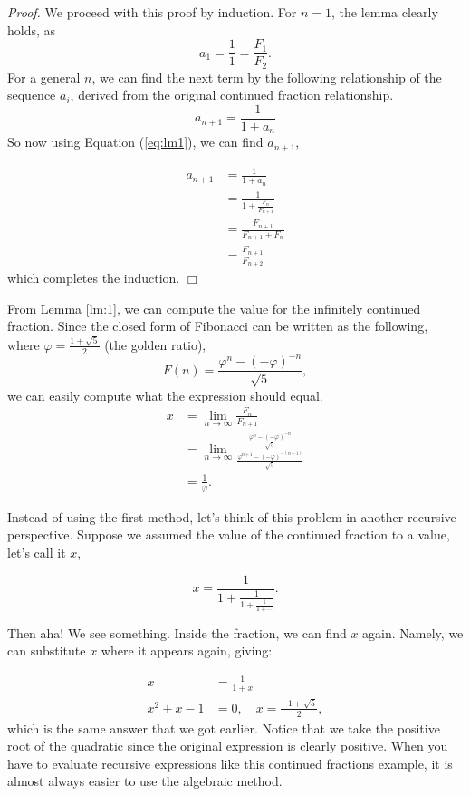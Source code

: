 \textit{Proof.} We proceed with this proof by induction. For $n=1$, the lemma clearly holds, as
$$a_1 = \frac{1}{1}= \frac{F_1}{F_2}.$$
For a general $n$, we can find the next term by the following relationship of the sequence $a_i$, derived from the original continued fraction relationship.
\begin{equation}
    a_{n+1} = \frac{1}{1+a_{n}}
    \label{eq:lm1}
\end{equation}
So now using Equation (\ref{eq:lm1}), we can find $a_{n+1}$, 

\begin{align*}
    a_{n+1} &= \frac{1}{1+a_{n}} \\
            &= \frac{1}{1+\frac{F_n}{F_{n+1}}} \\
            &= \frac{F_{n+1}}{F_{n+1}+F_{n}} \\
            &= \frac{F_{n+1}}{F_{n+2}} 
\end{align*}
which completes the induction. $\Box$

From Lemma \ref{lm:1}, we can compute the value for the infinitely continued fraction. Since the closed form of Fibonacci can be written as the following, where $\varphi = \frac{1+\sqrt{5}}{2}$ (the golden ratio),
\begin{equation}
    F\left(n\right) = \frac{\varphi^n-(-\varphi)^{-n}}{\sqrt{5}},
\end{equation}
we can easily compute what the expression should equal. 
\begin{align*}
    x &= \lim_{n\to\infty} \frac{F_n}{F_{n+1}}\\
      &= \lim_{n\to\infty} \frac{\frac{\varphi^n-(-\varphi)^{-n}}{\sqrt{5}}}{\frac{\varphi^{n+1}-(-\varphi)^{-(n+1)}}{\sqrt{5}}} \\
      &= \boxed{\frac{1}{\varphi}}.
\end{align*}

Instead of using the first method, let's think of this problem in another recursive perspective. Suppose we assumed the value of the continued fraction to a value, let's call it $x$, 

\begin{equation}
    x = \frac{1}{1+\frac{1}{1+\frac{1}{1+\cdots}}}.
\end{equation}

Then aha! We see something. Inside the fraction, we can find $x$ again. Namely, we can substitute $x$ where it appears again, giving:

\begin{align*}
    x &= \frac{1}{1+x} \\
    x^2 + x -1 &= 0, \quad x = \boxed{\frac{-1+\sqrt{5}}{2}},
\end{align*}
which is the same answer that we got earlier. Notice that we take the positive root of the quadratic since the original expression is clearly positive. When you have to evaluate recursive expressions like this continued fractions example, it is almost always easier to use the algebraic method.



